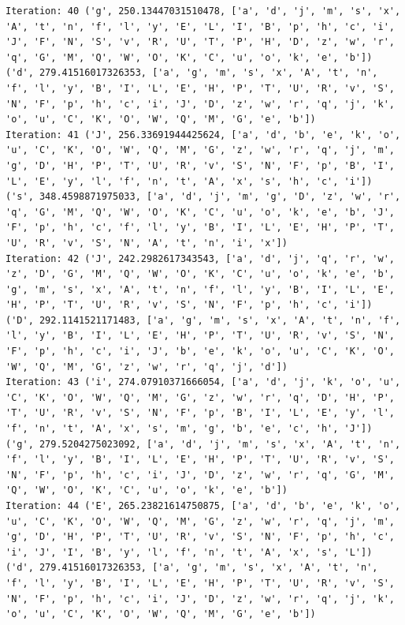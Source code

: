 \documentclass[11pt]{article}
\begin{document}
\begin{lstlisting}
Iteration: 40 ('g', 250.13447031510478, ['a', 'd', 'j', 'm', 's', 'x', 'A', 't', 'n', 'f', 'l', 'y', 'E', 'L', 'I', 'B', 'p', 'h', 'c', 'i', 'J', 'F', 'N', 'S', 'v', 'R', 'U', 'T', 'P', 'H', 'D', 'z', 'w', 'r', 'q', 'G', 'M', 'Q', 'W', 'O', 'K', 'C', 'u', 'o', 'k', 'e', 'b']) ('d', 279.41516017326353, ['a', 'g', 'm', 's', 'x', 'A', 't', 'n', 'f', 'l', 'y', 'B', 'I', 'L', 'E', 'H', 'P', 'T', 'U', 'R', 'v', 'S', 'N', 'F', 'p', 'h', 'c', 'i', 'J', 'D', 'z', 'w', 'r', 'q', 'j', 'k', 'o', 'u', 'C', 'K', 'O', 'W', 'Q', 'M', 'G', 'e', 'b'])
Iteration: 41 ('J', 256.33691944425624, ['a', 'd', 'b', 'e', 'k', 'o', 'u', 'C', 'K', 'O', 'W', 'Q', 'M', 'G', 'z', 'w', 'r', 'q', 'j', 'm', 'g', 'D', 'H', 'P', 'T', 'U', 'R', 'v', 'S', 'N', 'F', 'p', 'B', 'I', 'L', 'E', 'y', 'l', 'f', 'n', 't', 'A', 'x', 's', 'h', 'c', 'i']) ('s', 348.4598871975033, ['a', 'd', 'j', 'm', 'g', 'D', 'z', 'w', 'r', 'q', 'G', 'M', 'Q', 'W', 'O', 'K', 'C', 'u', 'o', 'k', 'e', 'b', 'J', 'F', 'p', 'h', 'c', 'f', 'l', 'y', 'B', 'I', 'L', 'E', 'H', 'P', 'T', 'U', 'R', 'v', 'S', 'N', 'A', 't', 'n', 'i', 'x'])
Iteration: 42 ('J', 242.2982617343543, ['a', 'd', 'j', 'q', 'r', 'w', 'z', 'D', 'G', 'M', 'Q', 'W', 'O', 'K', 'C', 'u', 'o', 'k', 'e', 'b', 'g', 'm', 's', 'x', 'A', 't', 'n', 'f', 'l', 'y', 'B', 'I', 'L', 'E', 'H', 'P', 'T', 'U', 'R', 'v', 'S', 'N', 'F', 'p', 'h', 'c', 'i']) ('D', 292.1141521171483, ['a', 'g', 'm', 's', 'x', 'A', 't', 'n', 'f', 'l', 'y', 'B', 'I', 'L', 'E', 'H', 'P', 'T', 'U', 'R', 'v', 'S', 'N', 'F', 'p', 'h', 'c', 'i', 'J', 'b', 'e', 'k', 'o', 'u', 'C', 'K', 'O', 'W', 'Q', 'M', 'G', 'z', 'w', 'r', 'q', 'j', 'd'])
Iteration: 43 ('i', 274.07910371666054, ['a', 'd', 'j', 'k', 'o', 'u', 'C', 'K', 'O', 'W', 'Q', 'M', 'G', 'z', 'w', 'r', 'q', 'D', 'H', 'P', 'T', 'U', 'R', 'v', 'S', 'N', 'F', 'p', 'B', 'I', 'L', 'E', 'y', 'l', 'f', 'n', 't', 'A', 'x', 's', 'm', 'g', 'b', 'e', 'c', 'h', 'J']) ('g', 279.5204275023092, ['a', 'd', 'j', 'm', 's', 'x', 'A', 't', 'n', 'f', 'l', 'y', 'B', 'I', 'L', 'E', 'H', 'P', 'T', 'U', 'R', 'v', 'S', 'N', 'F', 'p', 'h', 'c', 'i', 'J', 'D', 'z', 'w', 'r', 'q', 'G', 'M', 'Q', 'W', 'O', 'K', 'C', 'u', 'o', 'k', 'e', 'b'])
Iteration: 44 ('E', 265.23821614750875, ['a', 'd', 'b', 'e', 'k', 'o', 'u', 'C', 'K', 'O', 'W', 'Q', 'M', 'G', 'z', 'w', 'r', 'q', 'j', 'm', 'g', 'D', 'H', 'P', 'T', 'U', 'R', 'v', 'S', 'N', 'F', 'p', 'h', 'c', 'i', 'J', 'I', 'B', 'y', 'l', 'f', 'n', 't', 'A', 'x', 's', 'L']) ('d', 279.41516017326353, ['a', 'g', 'm', 's', 'x', 'A', 't', 'n', 'f', 'l', 'y', 'B', 'I', 'L', 'E', 'H', 'P', 'T', 'U', 'R', 'v', 'S', 'N', 'F', 'p', 'h', 'c', 'i', 'J', 'D', 'z', 'w', 'r', 'q', 'j', 'k', 'o', 'u', 'C', 'K', 'O', 'W', 'Q', 'M', 'G', 'e', 'b'])

\end{lstlisting}
\end{document}
